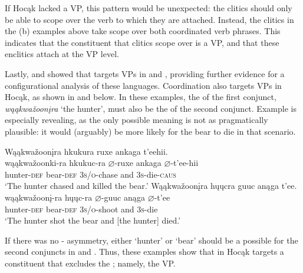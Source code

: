\documentclass[output=paper]{LSP/langsci}
\begin{document}
 
If Hocąk lacked a VP, this pattern would be unexpected: the clitics should only be able to scope over the verb to which they are attached. Instead, the clitics in the (b) examples above take scope over both coordinated verb phrases. This indicates that the constituent that clitics scope over is a VP, and that these enclitics attach at the VP level. 
	
Lastly, \citet{Boyle2007} and \citet{West2003} showed that  targets VPs in  and , providing further evidence for a configurational analysis of these languages.  Coordination also targets VPs in Hocąk, as shown in  and  below. In these examples, the  of the first conjunct, \textit{wąąkwa\v{z}oon\k{i}ra} `the hunter', must also be the  of the second conjunct.  Example  is especially revealing, as the only possible meaning is not as pragmatically plausible: it would (arguably) be more likely for the bear to die in that scenario.
 

\begin{exe}
\ex\label{ex:jrs:35} 
\glll Wąąkwa\v{z}oon\k{i}ra 		hk{u}k{u}ra 			ruxe 				ank{a}ga 	t'eehii. \\
wąąkwa\v{z}oonk{i}-ra 	hk{u}k{u}c-ra 		$\varnothing$-ruxe  		ank{a}ga 	$\varnothing$-t'ee-hii \\
hunter-\textsc{def} 					bear-\textsc{def} 	\textsc{3s/o}-chase and 		\textsc{3s}-die-\textsc{caus} \\
\trans`The hunter chased and killed the bear.'
  \ex\label{ex:jrs:36} 
\glll Wąąkwa\v{z}oon\k{i}ra 		h\k{u}\k{u}cra 		guuc 				anąga 	t'ee. \\
wąąkwa\v{z}oon\k{i}-ra 	h\k{u}\k{u}c-ra 		$\varnothing$-guuc 			anąga 	$\varnothing$-t'ee \\
hunter-\textsc{def} 		bear-\textsc{def} 	\textsc{3s/o}-shoot 		and 		\textsc{3s}-die \\
\trans `The hunter shot the bear and [the hunter] died.'
\end{exe}
	
 
If there was no - asymmetry, either `hunter' or `bear' should be a possible  for the second conjuncts in  and . Thus, these examples show that  in Hocąk targets a constituent that excludes the ; namely, the VP.
 
\end{document}

